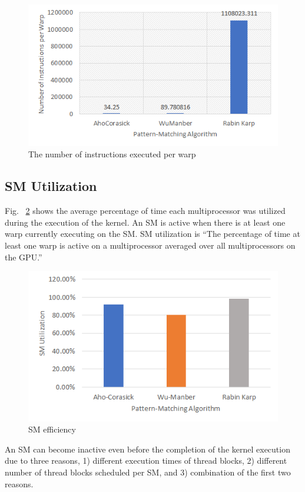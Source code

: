 \begin{figure}[H]
	\centering
	\includegraphics[width=12cm]{instructionsperwarp.png}
	\caption{The number of instructions executed per warp}
	\label{fig:number of instructions per warp}
\end{figure}
\squeezeup


\subsection{SM Utilization}

Fig. ~\ref{fig:smefficiency} shows the average percentage of time each multiprocessor was utilized during the execution of the kernel. An SM is active when there is at least one warp currently executing on the SM. SM utilization is “The percentage of time at least one warp is active on a multiprocessor averaged over all multiprocessors on the GPU.”  
\begin{figure}[H]
	\centering
	\includegraphics[width=12cm]{smefficiency.png}
	\caption{SM efficiency}
	\label{fig:smefficiency}
\end{figure}
\squeezeup


\bigskip
\bigskip
\bigskip
An SM can become inactive even before the completion of the kernel execution due to three reasons, 1) different execution times of thread blocks, 2) different number of thread blocks scheduled per SM, and 3) combination of the first two reasons.
 
